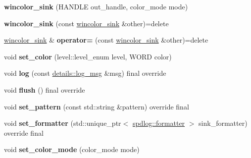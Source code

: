 \begin{DoxyCompactItemize}
\item 
\mbox{\label{classspdlog_1_1sinks_1_1wincolor__sink_a25febae337cfe9a8cce59b920a256069}} 
{\bfseries wincolor\+\_\+sink} (H\+A\+N\+D\+LE out\+\_\+handle, color\+\_\+mode mode)
\item 
\mbox{\label{classspdlog_1_1sinks_1_1wincolor__sink_a82cb0661d5cc108b0b866b4561919fda}} 
{\bfseries wincolor\+\_\+sink} (const \hyperlink{classspdlog_1_1sinks_1_1wincolor__sink}{wincolor\+\_\+sink} \&other)=delete
\item 
\mbox{\label{classspdlog_1_1sinks_1_1wincolor__sink_a5fb56028b3d25c8aeee51621c4c118e9}} 
\hyperlink{classspdlog_1_1sinks_1_1wincolor__sink}{wincolor\+\_\+sink} \& {\bfseries operator=} (const \hyperlink{classspdlog_1_1sinks_1_1wincolor__sink}{wincolor\+\_\+sink} \&other)=delete
\item 
\mbox{\label{classspdlog_1_1sinks_1_1wincolor__sink_abd9dd95d6b4884b022eaedda4bda2c40}} 
void {\bfseries set\+\_\+color} (level\+::level\+\_\+enum level, W\+O\+RD color)
\item 
\mbox{\label{classspdlog_1_1sinks_1_1wincolor__sink_a3f19ee0cb993cf531d7c4edb12ef6e4c}} 
void {\bfseries log} (const \hyperlink{structspdlog_1_1details_1_1log__msg}{details\+::log\+\_\+msg} \&msg) final override
\item 
\mbox{\label{classspdlog_1_1sinks_1_1wincolor__sink_a16f1678905d7ae423b7f49d99de06dfa}} 
void {\bfseries flush} () final override
\item 
\mbox{\label{classspdlog_1_1sinks_1_1wincolor__sink_abc09d98503b36214276e88dd70677a10}} 
void {\bfseries set\+\_\+pattern} (const std\+::string \&pattern) override final
\item 
\mbox{\label{classspdlog_1_1sinks_1_1wincolor__sink_a8f4c177e11a5a4f8d18432b75737c79e}} 
void {\bfseries set\+\_\+formatter} (std\+::unique\+\_\+ptr$<$ \hyperlink{classspdlog_1_1formatter}{spdlog\+::formatter} $>$ sink\+\_\+formatter) override final
\item 
\mbox{\label{classspdlog_1_1sinks_1_1wincolor__sink_aca6e9e0251b747eabe4ee859cb7306b0}} 
void {\bfseries set\+\_\+color\+\_\+mode} (color\+\_\+mode mode)
\end{DoxyCompactItemize}
